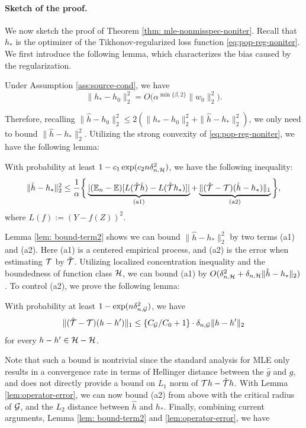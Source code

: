 \vspace{-2mm}
\paragraph{Sketch of the proof.}
We now sketch the proof of Theorem \ref{thm: mle-nonmisspec-noniter}. Recall that $h_*$ is the optimizer of the Tikhonov-regularized loss function \eqref{eq:pop-reg-noniter}. We first introduce the following lemma, which characterizes the bias caused by the regularization. 
\begin{lemma}\label{lem:bias-noniter}
    Under Assumption \ref{ass:source-cond}, we have $$
    \|h_* - h_0\|_2^2 =O\big(\alpha^{\min\{\beta,2\}}\|w_0\|_2^2\big).
    $$
\end{lemma}

Therefore, recalling $\|\hat h- h_0 \|_2^2 \leq 2(\|h_* - h_0\|_2^2 + \|\hat{h} - h_*\|_2^2)$, we only need to bound $\|\hat{h} - h_*\|_2^2$. Utilizing the strong convexity of \eqref{eq:pop-reg-noniter}, we have the following lemma:
\begin{lemma}\label{lem: bound-term2}
    With probability at least $1- c_1 \exp(c_2n\delta_{n,\mathcal{H}}^2)$, we have the following inequality: 
    \begin{align*}
        \|\hat h - h_* \|^2_2 
        \leq \frac{1}{\alpha}\bigg\{\underbrace{|(\mathbb{E}_n-\mathbb{E})  [L(\hat {{\mathcal{T}}} \hat h) - L(\hat{{\mathcal{T}}} h_*) ]|}_{\text{(a1)}}+ \underbrace{\|(\hat {{\mathcal{T}}} - {\mathcal{T}})(\hat h - h_*)\|_1}_{\text{(a2)}}\bigg\},
    \end{align*}
    where $L(f) := (Y - f(Z))^2$.
\end{lemma}
Lemma \ref{lem: bound-term2} shows we can bound $\|\hat{h} - h_{*}\|_2^2$ by two terms (a1) and (a2). Here (a1) is a centered empirical process, and  (a2) is the error when estimating ${\mathcal{T}}$ by $\hat{{\mathcal{T}}}$. Utilizing localized concentration inequality and the boundedness of function class $\mathcal{H}$, we can bound (a1) by $O(\delta_{n,\mathcal{H}}^2 + \delta_{n,\mathcal{H}}\|\hat{h} - h_*\|_2)$. To control (a2), we prove the following lemma: \begin{lemma}\label{lem:operator-error}
With probability at least $1-\exp(n\delta^2_{n,\mathcal{G}})$, we have 
$$\|(\hat {{\mathcal{T}}}-{\mathcal{T}})(h- h')\|_1 \leq \{C_{\mathcal{G}}/C_0+1\}\cdot \delta_{n,\mathcal{G}} \|h- h'\|_2    $$
for every $h- h' \in \mathcal{H} - \mathcal{H}$.
\end{lemma}
Note that such a bound is nontrivial since the standard analysis for MLE only results in a convergence rate in terms of Hellinger distance between the $\hat{g}$ and $g$, and does not directly provide a bound on $L_1$ norm of ${\mathcal{T}} h - \hat {{\mathcal{T}}} h$. With Lemma \ref{lem:operator-error}, we can now bound (a2) from above with the critical radius of $\mathcal{G}$, and the $L_2$ distance between $\hat h$ and $h_*$. Finally, combining current arguments, Lemma \ref{lem: bound-term2} and \ref{lem:operator-error},  we have

